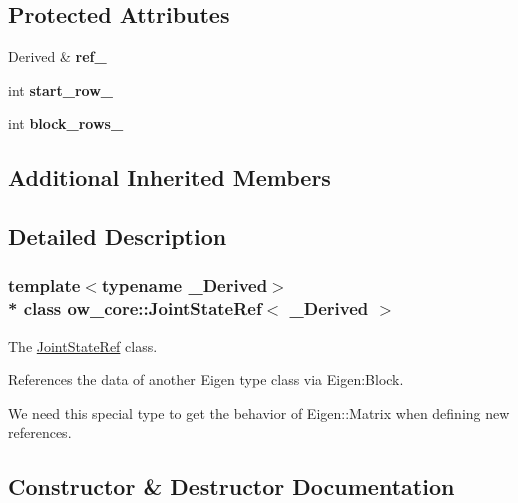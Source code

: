 \subsection*{Protected Attributes}
\begin{DoxyCompactItemize}
\item 
Derived \& {\bfseries ref\+\_\+}\hypertarget{classow__core_1_1JointStateRef_a8fa76da4b2ec2f2efcb204cd160f8a70}{}\label{classow__core_1_1JointStateRef_a8fa76da4b2ec2f2efcb204cd160f8a70}

\item 
int {\bfseries start\+\_\+row\+\_\+}\hypertarget{classow__core_1_1JointStateRef_acb30a9581809139d47a90e4e08950dae}{}\label{classow__core_1_1JointStateRef_acb30a9581809139d47a90e4e08950dae}

\item 
int {\bfseries block\+\_\+rows\+\_\+}\hypertarget{classow__core_1_1JointStateRef_a4a334d8442f397f939fbc6f6685c322a}{}\label{classow__core_1_1JointStateRef_a4a334d8442f397f939fbc6f6685c322a}

\end{DoxyCompactItemize}
\subsection*{Additional Inherited Members}


\subsection{Detailed Description}
\subsubsection*{template$<$typename \+\_\+\+Derived$>$\\*
class ow\+\_\+core\+::\+Joint\+State\+Ref$<$ \+\_\+\+Derived $>$}

The \hyperlink{classow__core_1_1JointStateRef}{Joint\+State\+Ref} class. 

References the data of another Eigen type class via Eigen\+:Block.

We need this special type to get the behavior of Eigen\+::\+Matrix when defining new references. 

\subsection{Constructor \& Destructor Documentation}
